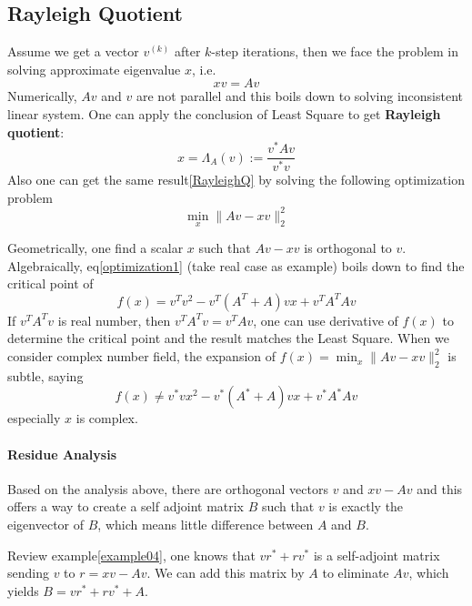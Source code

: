 
\subsection*{Rayleigh Quotient}
Assume we get a vector $v^{(k)}$ after $k$-step iterations, then we face the problem in solving approximate eigenvalue $x$, i.e. 
$$
x v=Av
$$
Numerically, $Av$ and $v$ are not parallel and this boils down to solving inconsistent linear system. One can apply the conclusion of Least Square to get \textbf{Rayleigh quotient}:
\begin{equation}
    \label{RayleighQ}
    x = \Lambda_{A}(v) := \frac{v^{*}Av}{v^{*}v}
\end{equation}
Also one can get the same result\eqref{RayleighQ} by solving the following optimization problem
\begin{equation}
    \label{optimization1}
    \operatorname{min}_{x} \|Av-x v\|_{2}^{2}
\end{equation}

Geometrically, one find a scalar $x$ such that $Av-xv$ is orthogonal to $v$. Algebraically, eq\eqref{optimization1} (take real case as example) boils down to find the critical point of
$$
f(x)=v^{T}v ^{2}- v^{T}(A^{T}+A)v x+v^{T}A^{T}Av
$$
If $v^{T}A^{T}v$ is real number, then $v^{T}A^{T}v = v^{T}Av$, one can use derivative of $f(x)$ to determine the critical point and the result matches the Least Square. When we consider complex number field, the expansion of $f(x)=\operatorname{min}_{x} \|Av-x v\|_{2}^{2}$ is subtle, saying
$$
f(x)\neq v^{*}v x^{2}- v^{*}(A^{*}+A)v x+v^{*}A^{*}Av
$$
especially $x$ is complex. 

\paragraph{Residue Analysis}
Based on the analysis above, there are orthogonal vectors $v$ and $xv-Av$ and this offers a way to create a self adjoint matrix $B$ such that $v$ is exactly the eigenvector of $B$, which means little difference between $A$ and $B$.

Review example\ref{example04}, one knows that $vr^{*} +r v^{*}$ is a self-adjoint matrix sending $v$ to $r=xv-Av$. We can add this matrix by $A$ to eliminate $Av$, which yields $B=vr^{*} +r v^{*}+A$.